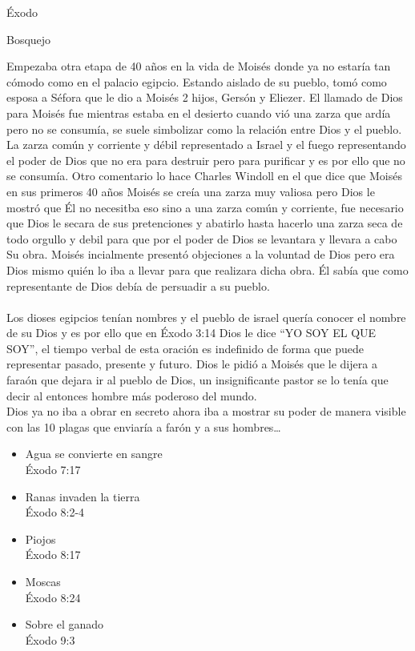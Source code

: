 \begin{section}{Éxodo}
\begin{subsection}{Bosquejo}
\begin{enumerate}
\begin{enumerate}
						Empezaba otra etapa de 40 años en la vida de Moisés donde ya no estaría tan cómodo como en el palacio egipcio. Estando aislado de su pueblo, tomó como esposa a Séfora que le dio a Moisés 2 hijos, Gersón y Eliezer. El llamado de Dios para Moisés fue mientras estaba en el desierto cuando vió una zarza que ardía pero no se consumía, se suele simbolizar como la relación entre Dios y el pueblo. La zarza común y corriente y débil representado a Israel y el fuego representando el poder de Dios que no era para destruir pero para purificar y es por ello que no se consumía.\newpage
						Otro comentario lo hace Charles Windoll en el que dice que Moisés en sus primeros 40 años Moisés se creía una zarza muy valiosa pero Dios le mostró que Él no necesitba eso sino a una zarza común y corriente, fue necesario que Dios le secara de sus pretenciones y abatirlo hasta hacerlo una zarza seca de todo orgullo y debil para que por el poder de Dios se levantara y llevara a cabo Su obra. Moisés incialmente presentó objeciones a la voluntad de Dios pero era Dios mismo quién lo iba a llevar para que realizara dicha obra.  Él sabía que como representante de Dios debía de persuadir a su pueblo. \\~\\
						Los dioses egipcios tenían nombres y el pueblo de israel quería conocer el nombre de su Dios y es por ello que en Éxodo 3:14 Dios le dice ``YO SOY EL QUE SOY'', el tiempo verbal de esta oración es indefinido de forma que puede representar pasado, presente y futuro. Dios le pidió a Moisés que le dijera a faraón que dejara ir al pueblo de Dios, un insignificante pastor se lo tenía que decir al entonces hombre más poderoso del mundo.\\
						Dios ya no iba a obrar en secreto ahora iba a mostrar su poder de manera visible con las 10 plagas que enviaría a farón y a sus hombres\ldots
					\begin{itemize}
						\item Agua se convierte en sangre\\
							Éxodo 7:17
						\item Ranas invaden la tierra\\
							Éxodo 8:2-4
						\item Piojos\\
							Éxodo 8:17
						\item Moscas\\
							Éxodo 8:24
						\item Sobre el ganado\\
							Éxodo 9:3

\end{itemize}
\end{enumerate}
\end{enumerate}
\end{subsection}
\end{section}
